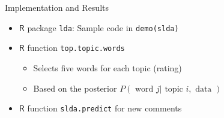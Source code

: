 \documentclass[final]{beamer}
\newlength{\midcolwid} %
\begin{document}
\begin{frame}[t]
\begin{columns}[t]
\begin{column}{\midcolwid}
\begin{block}{Implementation and Results}

\begin{itemize}
\item $\mathsf{R}$ package \texttt{lda}: Sample code in \texttt{demo(slda)}
\item $\mathsf{R}$ function \texttt{top.topic.words}~\cite{lda}
	\begin{itemize}
	\item Selects five words for each topic (rating)
	\item Based on the posterior $P(\text{ word } j | \text{ topic } i, \text{ data })$
	\end{itemize}
\item $\mathsf{R}$ function \texttt{slda.predict} for new comments
\end{itemize}
\vspace{-10pt}


\end{block}
\end{column}
\end{columns}
\end{frame}
\end{document}
